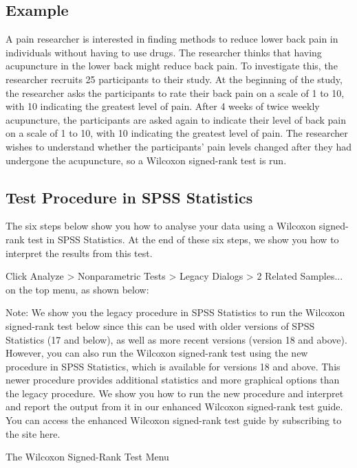 \documentclass[]{article}
\begin{document}
\subsection{Example}
A pain researcher is interested in finding methods to reduce lower back pain in individuals without having to use drugs. The researcher thinks that having acupuncture in the lower back might reduce back pain. To investigate this, the researcher recruits 25 participants to their study. At the beginning of the study, the researcher asks the participants to rate their back pain on a scale of 1 to 10, with 10 indicating the greatest level of pain. After 4 weeks of twice weekly acupuncture, the participants are asked again to indicate their level of back pain on a scale of 1 to 10, with 10 indicating the greatest level of pain. The researcher wishes to understand whether the participants' pain levels changed after they had undergone the acupuncture, so a Wilcoxon signed-rank test is run.



\subsection{Test Procedure in SPSS Statistics}
The six steps below show you how to analyse your data using a Wilcoxon signed-rank test in SPSS Statistics. At the end of these six steps, we show you how to interpret the results from this test.

Click Analyze > Nonparametric Tests > Legacy Dialogs > 2 Related Samples... on the top menu, as shown below:

Note: We show you the legacy procedure in SPSS Statistics to run the Wilcoxon signed-rank test below since this can be used with older versions of SPSS Statistics (17 and below), as well as more recent versions (version 18 and above). However, you can also run the Wilcoxon signed-rank test using the new procedure in SPSS Statistics, which is available for versions 18 and above. This newer procedure provides additional statistics and more graphical options than the legacy procedure. We show you how to run the new procedure and interpret and report the output from it in our enhanced Wilcoxon signed-rank test guide. You can access the enhanced Wilcoxon signed-rank test guide by subscribing to the site here.

The Wilcoxon Signed-Rank Test Menu
\end{document}
